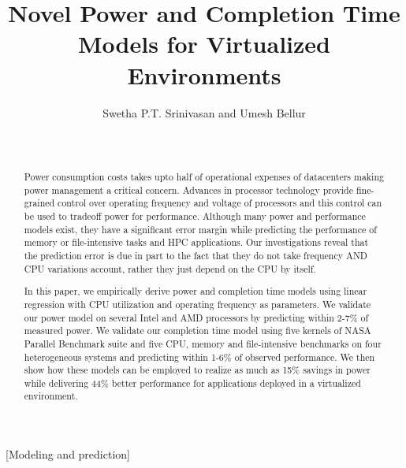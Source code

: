 \documentclass{sig-alternate}
\begin{document}
\title{Novel Power and Completion Time Models for Virtualized Environments}

\author{
\alignauthor
Swetha P.T. Srinivasan and Umesh Bellur\\
    \\
    \\
}

\maketitle
\begin{abstract}
Power consumption costs takes upto half of operational expenses of datacenters making power management a critical concern. Advances in processor technology provide fine-grained control over operating frequency and voltage of processors and this control can be used to tradeoff power for performance. Although many power and performance models exist, they have a significant error margin while predicting the performance of memory or file-intensive tasks and HPC applications. Our investigations reveal that the prediction error is due in part to the fact that they do not take frequency AND CPU variations account, rather they just depend on the CPU by itself.

In this paper, we empirically derive power and completion time models using linear regression with CPU utilization and operating frequency as parameters. We validate our power model on several Intel and AMD processors by predicting within 2-7\% of measured power. We validate our completion time model using five kernels of NASA Parallel Benchmark suite and five CPU, memory and file-intensive benchmarks on four heterogeneous systems and predicting within 1-6\% of observed performance. We then show how these models can be employed to realize as much as 15\% savings in power while delivering 44\% better performance for applications deployed in a virtualized environment. 
\end{abstract}

[Modeling and prediction]
\end{document}
